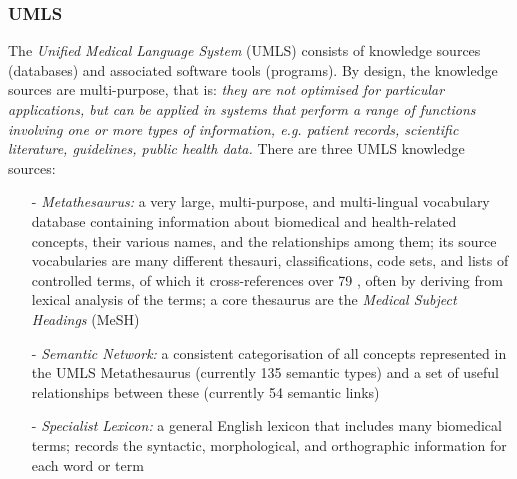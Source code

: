 %
%
%
%
%
%
%

\subsubsection{UMLS}
\label{umls_heading}

The \emph{Unified Medical Language System} (UMLS) consists of knowledge sources
(databases) and associated software tools (programs). By design, the knowledge
sources are multi-purpose, that is: \textit{they are not optimised for particular
applications, but can be applied in systems that perform a range of functions
involving one or more types of information, e.g. patient records, scientific
literature, guidelines, public health data.} \cite{umls} There are three UMLS
knowledge sources:

\begin{itemize}
    \item[-] \emph{Metathesaurus:} a very large, multi-purpose, and
        multi-lingual vocabulary database containing information about
        biomedical and health-related concepts, their various names, and the
        relationships among them; its source vocabularies are many different
        thesauri, classifications, code sets, and lists of controlled terms, of
        which it cross-references over 79 \cite{rogers}, often by deriving from
        lexical analysis of the terms; a core thesaurus are the
        \emph{Medical Subject Headings} (MeSH)
    \item[-] \emph{Semantic Network:} a consistent categorisation of all
        concepts represented in the UMLS Metathesaurus (currently 135 semantic
        types) and a set of useful relationships between these (currently 54
        semantic links)
    \item[-] \emph{Specialist Lexicon:} a general English lexicon that includes
        many biomedical terms; records the syntactic, morphological, and
        orthographic information for each word or term
\end{itemize}

